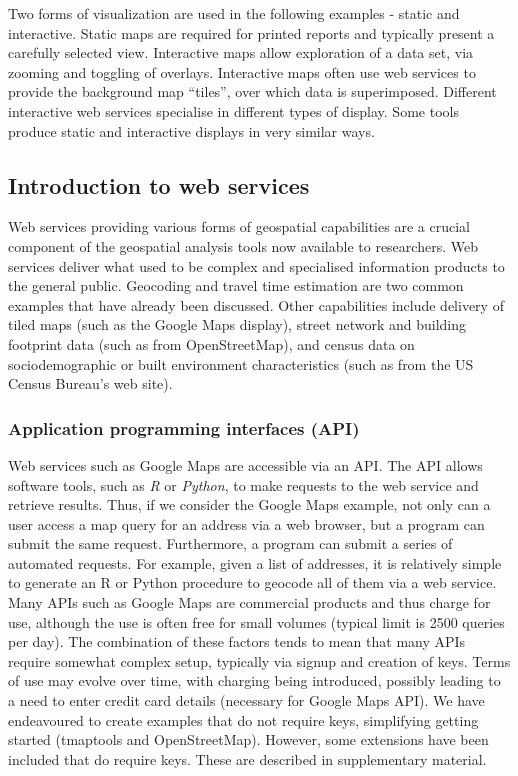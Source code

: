 \documentclass[utf8]{frontiersHLTH}
\begin{document}
Two forms of visualization are used in the following examples - static
and interactive. Static maps are required for printed reports and
typically present a carefully selected view. Interactive maps allow
exploration of a data set, via zooming and toggling of
overlays. Interactive maps often use web services to provide the
background map ``tiles'', over which data is superimposed. Different
interactive web services specialise in different types of
display. Some tools produce static and interactive displays in very
similar ways.

\subsection{Introduction to web services}\label{introduction-to-web-services}

Web services providing various forms of geospatial capabilities are a
crucial component of the geospatial analysis tools now available to
researchers. Web services deliver what used to be complex and
specialised information products to the general public. Geocoding and
travel time estimation are two common examples that have already been
discussed. Other capabilities include delivery of tiled maps (such as
the Google Maps display), street network and building footprint data
(such as from OpenStreetMap), and census data on sociodemographic or
built environment characteristics (such as from the US Census Bureau's
web site).

\subsubsection{Application programming interfaces (API)}\label{application-programming-interfaces-api} 
Web services such as Google Maps are accessible via an API. The API
allows software tools, such as {\em R} or {\em Python}, to make
requests to the web service and retrieve results. Thus, if we consider
the Google Maps example, not only can a user access a map query for an
address via a web browser, but a program can submit the same
request. Furthermore, a program can submit a series of automated
requests. For example, given a list of addresses, it is relatively
simple to generate an R or Python procedure to geocode all of them via
a web service. Many APIs such as Google Maps are commercial products
and thus charge for use, although the use is often free for small
volumes (typical limit is 2500 queries per day). The combination of
these factors tends to mean that many APIs require somewhat complex
setup, typically via signup and creation of keys. Terms of use may
evolve over time, with charging being introduced, possibly leading to
a need to enter credit card details (necessary for Google Maps API). We have endeavoured to create
examples that do not require keys, simplifying getting
started (tmaptools and OpenStreetMap). However, some extensions have been included that do require
keys. These are described in supplementary material.
\end{document}
